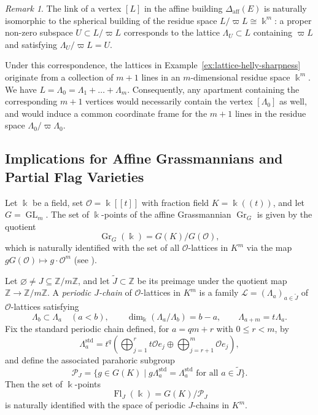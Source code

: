 \documentclass[12pt]{amsart}
\theoremstyle{definition}
\theoremstyle{remark}
\newtheorem{rmk}[theorem]{Remark}
\begin{document}
\begin{rmk}
\label{rmk:residue-obstruction}
The link of a vertex $[L]$ in the affine building $\Delta_{\mathrm{aff}}(E)$ is naturally isomorphic to the spherical building of the residue space $L/\varpi L \cong \Bbbk^m$: a proper non-zero subspace $U \subset L/\varpi L$ corresponds to the lattice $\Lambda_U \subset L$ containing $\varpi L$ and satisfying $\Lambda_U / \varpi L = U$.

Under this correspondence, the lattices in Example~\ref{ex:lattice-helly-sharpness} originate from a collection of $m+1$ lines in an $m$-dimensional residue space $\Bbbk^m$. We have $L=\Lambda_0 = \Lambda_1 + \dots + \Lambda_m$. Consequently, any apartment containing the corresponding $m+1$ vertices would necessarily contain the vertex $[\Lambda_0]$ as well, and would induce a common coordinate frame for the $m+1$ lines in the residue space $\Lambda_0/\varpi \Lambda_0$. %
\end{rmk}

\subsection{Implications for Affine Grassmannians and Partial Flag Varieties}
\label{subsec:aff_gr_and_flags}

Let $\Bbbk$ be a field, set $\mathcal{O} = \Bbbk[[t]]$ with fraction field $K = \Bbbk((t))$, and let $G = \operatorname{GL}_m$. The set of $\Bbbk$-points of the affine Grassmannian $\operatorname{Gr}_G$ is given by the quotient
\[
  \operatorname{Gr}_G(\Bbbk) = G(K) / G(\mathcal{O}),
\]
which is naturally identified with the set of all  $\mathcal{O}$-lattices in $K^m$ via the map $g G(\mathcal{O}) \mapsto g \cdot \mathcal{O}^m$ (see \cite[Section~1.1]{Zhu17}).

Let $\varnothing \neq J \subseteq \mathbb{Z}/m\mathbb{Z}$, and let $\widetilde{J} \subset \mathbb{Z}$ be its preimage under the quotient map $\mathbb{Z} \to \mathbb{Z}/m\mathbb{Z}$. A \textit{periodic $J$-chain} of $\mathcal{O}$-lattices in $K^m$ is a family $\mathcal{L} = (\Lambda_a)_{a \in \widetilde{J}}$ of  $\mathcal{O}$-lattices satisfying
\[
  \Lambda_b \subset \Lambda_a \quad (a < b), \qquad \dim_{\Bbbk}(\Lambda_a / \Lambda_b) = b - a, \qquad \Lambda_{a+m} = t \Lambda_a.
\]
Fix the standard periodic chain defined, for $a = qm + r$ with $0 \le r < m$, by
\[
  \Lambda_a^{\mathrm{std}} = t^q \left( \bigoplus_{j=1}^r t \mathcal{O} e_j \oplus \bigoplus_{j=r+1}^m \mathcal{O} e_j \right),
\]
and define the associated parahoric subgroup
\[
  \mathcal{P}_J = \{ g \in G(K) \mid g \Lambda_a^{\mathrm{std}} = \Lambda_a^{\mathrm{std}} \text{ for all } a \in \widetilde{J} \}.
\]
Then the set of $\Bbbk$-points 
\[
\operatorname{Fl}_J(\Bbbk) = G(K) / \mathcal{P}_J
\]
is naturally identified with the space of periodic $J$-chains in $K^m$.
\end{document}

